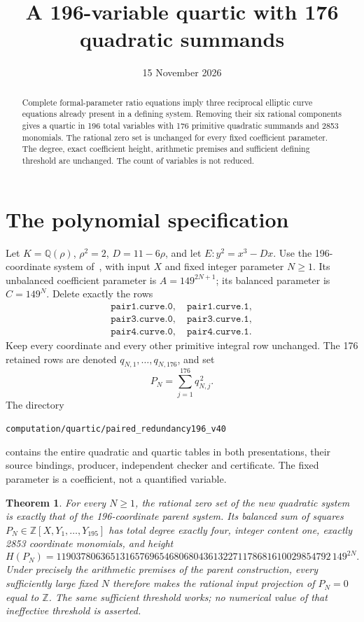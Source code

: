 \documentclass[11pt,a4paper]{article}
\title{A 196-variable quartic with 176 quadratic summands}
\author{}\date{15 November 2026}
\newtheorem{theorem}{Theorem}[section]
\newcommand{\Q}{\mathbb Q}\newcommand{\Z}{\mathbb Z}
\begin{document}
\maketitle
\begin{abstract}
Complete formal-parameter ratio equations imply three reciprocal elliptic
curve equations already present in a defining system. Removing their six
rational components gives a quartic in 196 total variables with 176
primitive quadratic summands and 2853 monomials. The rational zero set is
unchanged for every fixed coefficient parameter. The degree, exact
coefficient height, arithmetic premises and sufficient defining threshold
are unchanged. The count of variables is not reduced.
\end{abstract}

\section{The polynomial specification}
Let $K=\Q(\rho)$, $\rho^2=2$, $D=11-6\rho$, and let
$E:y^2=x^3-Dx$. Use the 196-coordinate system of~\cite{Laurent},
with input $X$ and fixed integer parameter $N\ge1$. Its unbalanced
coefficient parameter is $A=149^{2N+1}$; its balanced parameter is
$C=149^N$. Delete exactly the rows
\[
\begin{gathered}
\texttt{pair1.curve.0},\quad\texttt{pair1.curve.1},\\
\texttt{pair3.curve.0},\quad\texttt{pair3.curve.1},\\
\texttt{pair4.curve.0},\quad\texttt{pair4.curve.1}.
\end{gathered}
\]
Keep every coordinate and every other primitive integral row unchanged.
The 176 retained rows are denoted $q_{N,1},\ldots,q_{N,176}$, and set
\[
                   P_N=\sum_{j=1}^{176}q_{N,j}^{\,2}.
\]
The directory
\begin{center}\small
\nolinkurl{computation/quartic/paired_redundancy196_v40}
\end{center}
contains the entire quadratic and quartic tables in both presentations,
their source bindings, producer, independent checker and certificate.
The fixed parameter is a coefficient, not a quantified variable.

\begin{theorem}\label{thm:main}
For every $N\ge1$, the rational zero set of the new quadratic system is
exactly that of the 196-coordinate parent system. Its balanced sum of
squares $P_N\in\Z[X,Y_1,\ldots,Y_{195}]$ has total degree exactly four,
integer content one, exactly 2853 coordinate monomials, and height
\[
 H(P_N)=
 11903780636513165769654680680436132271178681610029854792
 \,149^{2N}.
\]
Under precisely the arithmetic premises of the parent construction,
every sufficiently large fixed $N$ therefore makes the rational input
projection of $P_N=0$ equal to $\Z$. The same sufficient threshold works;
no numerical value of that ineffective threshold is asserted.
\end{theorem}
\end{document}
